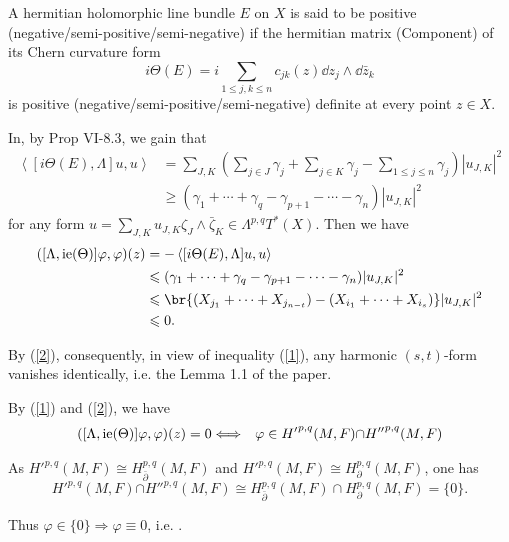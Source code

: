 \documentclass[lang=en,12pt]{beautybook}
\begin{document}
\begin{definition}
    A hermitian holomorphic line bundle $E$ on $X$ is said to be positive (negative/semi-positive/semi-negative) if the hermitian matrix (Component) of its Chern curvature form 
    \[i\Theta(E)=i\sum_{1\leqslant j,k\leqslant n}c_{jk}(z)\dd z_j\wedge\dd \bar{z}_k\]
    is positive (negative/semi-positive/semi-negative) definite at every point $z\in X$.
\end{definition}
    In\cite[P334]{CACA},  by Prop VI-8.3, we gain that
    \begin{align*}
        \left\langle [i\Theta(E),\Lambda]u,u\right\rangle &= \sum_{J,K} (\sum_{j\in J}\gamma_j+\sum_{j\in K}\gamma_j-\sum_{1\leqslant j\leqslant n}\gamma_j)|u_{J,K}|^2\\ 
        &\geqslant (\gamma_1+\cdots+\gamma_q-\gamma_{p+1}-\cdots-\gamma_n)|u_{J,K}|^2
    \end{align*}
        for any form $u=\sum_{J,K} u_{J,K} \zeta_J\wedge\bar{\zeta}_K\in \Lambda^{p,q}T^*(X)$.
Then we have 
\begin{align*}
    ( [\Lambda, \tmop{ie} (\Theta)] \varphi, \varphi) (z) &=-\left\langle [i\Theta(E),\Lambda]u,u\right\rangle \\
    & \leqslant  (\gamma_1+\cdots+\gamma_q-\gamma_{p+1}-\cdots-\gamma_n)|u_{J,K}|^2\\
    & \leqslant \br{(X_{j_1}+\cdots+X_{j_{n-t}}) -(X_{i_1}+\cdots+X_{i_s})}|u_{J,K}|^2\\ 
    & \leqslant 0.
\end{align*}

By (\ref{2}), consequently, in view of inequality (\ref{1}), any harmonic $(s,
t)$-form vanishes identically, i.e. the Lemma 1.1 of the paper.

\begin{remark}
  By (\ref{1}) and (\ref{2}), we have \cite[Lemma2,P483]{calabi1960compact}
  \begin{eqnarray*}
    ( [\Lambda, \operatorname{ie} (\Theta)] \varphi, \varphi) (z) = 0 &
    \Longleftrightarrow & {\varphi \in H'}^{p, q} (M, F) {\cap H''}^{p, q} (M,
    F)
  \end{eqnarray*}

  As ${H'}^{p, q} (M, F) \cong H_{\bar{\partial}}^{p, q} (M, F)$ and ${H'}^{p,
q} (M, F) \cong H_{\partial}^{p, q} (M, F)$, one has
\begin{equation}
  {H'}^{p, q} (M, F) {\cap H''}^{p, q} (M, F) \cong H_{\bar{\partial}}^{p, q}
  (M, F) \cap H_{\partial}^{p, q} (M, F) = \{ 0 \} . \label{3}
\end{equation}

Thus $\varphi \in \{ 0 \} \Longrightarrow \varphi \equiv 0$, i.e.
{}.
\end{remark}
\end{document}
